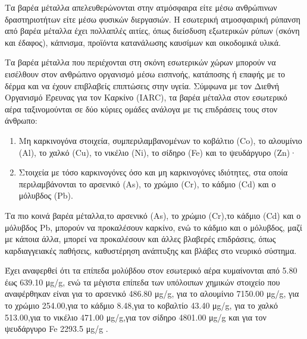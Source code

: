 Τα βαρέα μέταλλα απελευθερώνονται στην ατμόσφαιρα είτε μέσω ανθρώπινων δραστηριοτήτων είτε μέσω φυσικών διεργασιών. 
Η εσωτερική ατμοσφαιρική ρύπανση από βαρέα μέταλλα έχει πολλαπλές αιτίες, όπως διείσδυση εξωτερικών ρύπων (σκόνη και έδαφος), κάπνισμα, προϊόντα κατανάλωσης καυσίμων και οικοδομικά υλικά.

Τα βαρέα μέταλλα που περιέχονται στη σκόνη εσωτερικών χώρων μπορούν να εισέλθουν στον ανθρώπινο οργανισμό μέσω εισπνοής, κατάποσης ή επαφής με το δέρμα και να έχουν επιβλαβείς επιπτώσεις στην υγεία.
Σύμφωνα με τον Διεθνή Οργανισμό Έρευνας για τον Καρκίνο (IARC), τα βαρέα μέταλλα στον εσωτερικό αέρα ταξινομούνται σε δύο κύριες ομάδες ανάλογα με τις επιδράσεις τους στον άνθρωπο:

\begin{enumerate}
    \item Μη καρκινογόνα στοιχεία, συμπεριλαμβανομένων το κοβάλτιο (Co), το αλουμίνιο (Al), το χαλκό (Cu), το νικέλιο (Ni), το σίδηρο (Fe) και το ψευδάργυρο (Zn)·
    \item Στοιχεία με τόσο καρκινογόνες όσο και μη καρκινογόνες ιδιότητες, στα οποία περιλαμβάνονται το αρσενικό (As), το χρώμιο (Cr), το κάδμιο (Cd) και ο μόλυβδος (Pb). 
\end{enumerate}

Τα πιο κοινά βαρέα μέταλλα,το αρσενικό (As), το χρώμιο (Cr),το κάδμιο (Cd) και ο μόλυβδος Pb,
 μπορούν να προκαλέσουν καρκίνο, ενώ το κάδμιο και ο μόλυβδος, μαζί με κάποια άλλα, μπορεί να προκαλέσουν και άλλες βλαβερές επιδράσεις, όπως καρδιαγγειακές παθήσεις, καθυστέρηση ανάπτυξης και βλάβες στο νευρικό σύστημα.

Έχει αναφερθεί ότι τα επίπεδα μολύβδου στον εσωτερικό αέρα κυμαίνονται από 5.80 έως 639.10 μg/g, ενώ τα μέγιστα επίπεδα των υπόλοιπων χημικών στοιχείο που αναφέρθηκαν είναι για το αρσενικό 486.80 μg/g, 
για το αλουμίνιο 7150.00 μg/g, για το χρώμιο 254.00,για το κάδμιο 8.48,για το κοβαλτίο  43.40 μg/g, για το χαλκό 513.00,για το νικέλιο 471.00 μg/g,για τον σίδηρο 4801.00 μg/g και για τον ψευδάργυρο Fe 2293.5 μg/g \cite{ijerph17082927}.

